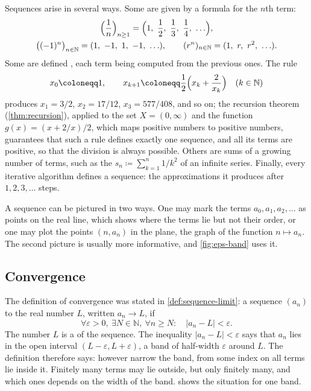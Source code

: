 Sequences arise in several ways. Some are given by a formula for the $n$th term:
\begin{gather*}
\Bigl(\frac1n\Bigr)_{n\ge1}=\Bigl(1,\ \frac12,\ \frac13,\ \frac14,\ \ldots\Bigr),\\
\bigl((-1)^n\bigr)_{n\in\mathbb N}=(1,\ -1,\ 1,\ -1,\ \ldots),\qquad(r^n)_{n\in\mathbb N}=(1,\ r,\ r^2,\ \ldots).
\end{gather*}
Some are defined , each term being computed from the previous ones. The rule
\begin{equation}
x_0\coloneqq1,\qquad x_{k+1}\coloneqq\frac12\Bigl(x_k+\frac2{x_k}\Bigr)\quad(k\in\mathbb N)
\label{eq:heron-def}
\end{equation}
produces $x_1=3/2$, $x_2=17/12$, $x_3=577/408$, and so on; the recursion theorem (\cref{thm:recursion}), applied to the set $X=(0,\infty)$ and the function $g(x)=(x+2/x)/2$, which maps positive numbers to positive numbers, guarantees that such a rule defines exactly one sequence, and all its terms are positive, so that the division is always possible. Others are sums of a growing number of terms, such as the  $s_n\coloneqq\sum_{k=1}^n1/k^2$ of an infinite series. Finally, every iterative algorithm defines a sequence: the approximations it produces after $1,2,3,\ldots$ steps.

A sequence can be pictured in two ways. One may mark the terms $a_0,a_1,a_2,\ldots$ as points on the real line, which shows where the terms lie but not their order, or one may plot the points $(n,a_n)$ in the plane, the graph of the function $n\mapsto a_n$. The second picture is usually more informative, and \cref{fig:eps-band} uses it.

\subsection{Convergence}

The definition of convergence was stated in \cref{def:sequence-limit}: a sequence $(a_n)$  to the real number $L$, written $a_n\to L$, if
\begin{equation}
\forall\varepsilon>0,\ \exists N\in\mathbb N,\ \forall n\ge N:\quad|a_n-L|<\varepsilon .
\label{eq:seq-limit}
\end{equation}
The number $L$ is a  of the sequence. The inequality $|a_n-L|<\varepsilon$ says that $a_n$ lies in the open interval $(L-\varepsilon,L+\varepsilon)$, a band of half-width $\varepsilon$ around $L$. The definition therefore says: however narrow the band, from some index on all terms lie inside it. Finitely many terms may lie outside, but only finitely many, and which ones depends on the width of the band.  shows the situation for one band.

